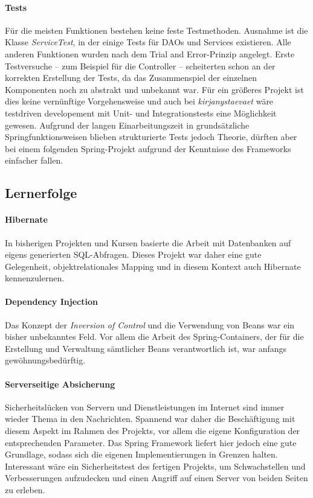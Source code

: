 		\paragraph{Tests} Für die meisten Funktionen bestehen keine feste Testmethoden. Ausnahme ist die Klasse \textit{ServiceTest}, in der einige Tests für DAOs und Services existieren. Alle anderen Funktionen wurden nach dem Trial and Error-Prinzip angelegt. Erste Testversuche -- zum Beispiel für die Controller -- scheiterten schon an der korrekten Erstellung der Tests, da das Zusammenspiel der einzelnen Komponenten noch zu abstrakt und unbekannt war. Für ein größeres Projekt ist dies keine vernünftige Vorgehensweise und auch bei \textit{kirjanystaevaet} wäre testdriven developement mit Unit- und Integrationstests eine Möglichkeit gewesen. Aufgrund der langen Einarbeitungszeit in grundsätzliche Springfunktionsweisen blieben strukturierte Tests jedoch Theorie, dürften aber bei einem folgenden Spring-Projekt aufgrund der Kenntnisse des Frameworks einfacher fallen.

	\subsection{Lernerfolge}
		\paragraph{Hibernate} In bisherigen Projekten und Kursen basierte die Arbeit mit Datenbanken auf eigens generierten SQL-Abfragen. Dieses Projekt war daher eine gute Gelegenheit, objekt\-relationales Mapping und in diesem Kontext auch Hibernate kennenzulernen.
		
		\paragraph{Dependency Injection} Das Konzept der \textit{Inversion of Control} und die Verwendung von Beans war ein bisher unbekanntes Feld. Vor allem die Arbeit des Spring-Containers, der für die Erstellung und Verwaltung sämtlicher Beans verantwortlich ist, war anfangs ge\-wöhnungs\-be\-dürftig.
		
		\paragraph{Serverseitige Absicherung}
		Sicherheitslücken von Servern und Dienstleistungen im Internet sind immer wieder Thema in den Nachrichten. Spannend war daher die Be\-schäf\-ti\-gung mit diesem Aspekt im Rahmen des Projekts, vor allem die eigene Konfiguration der entsprechenden Parameter. Das Spring Framework liefert hier jedoch eine gute Grundlage, sodass sich die eigenen Implementierungen in Grenzen halten. Interessant wäre ein Sicherheitstest des fertigen Projekts, um Schwachstellen und Verbesserungen aufzudecken und einen Angriff auf einen Server von beiden Seiten zu erleben.
		
